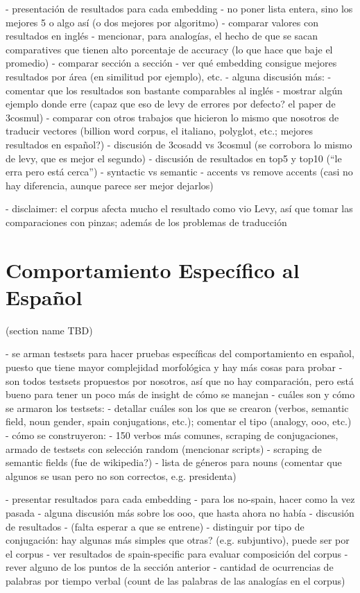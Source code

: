 - presentación de resultados para cada embedding
    - no poner lista entera, sino los mejores 5 o algo así (o dos mejores por algoritmo)
    - comparar valores con resultados en inglés
    - mencionar, para analogías, el hecho de que se sacan comparatives que tienen alto porcentaje de accuracy (lo que hace que baje el promedio)
        - comparar sección a sección
    - ver qué embedding consigue mejores resultados por área (en similitud por ejemplo), etc.
- alguna discusión más:
    - comentar que los resultados son bastante comparables al inglés
    - mostrar algún ejemplo donde erre (capaz que eso de levy de errores por defecto? el paper de 3cosmul)
    - comparar con otros trabajos que hicieron lo mismo que nosotros de traducir vectores (billion word corpus, el italiano, polyglot, etc.; mejores resultados en español?)
    - discusión de 3cosadd vs 3cosmul (se corrobora lo mismo de levy, que es mejor el segundo)
    - discusión de resultados en top5 y top10 (``le erra pero está cerca'')
    - syntactic vs semantic
    - accents vs remove accents (casi no hay diferencia, aunque parece ser mejor dejarlos)


- disclaimer: el corpus afecta mucho el resultado como vio Levy, así que tomar las comparaciones con pinzas; además de los problemas de traducción


\section{Comportamiento Específico al Español}
(section name TBD)

- se arman testsets para hacer pruebas específicas del comportamiento en español, puesto que tiene mayor complejidad morfológica y hay más cosas para probar
- son todos testsets propuestos por nosotros, así que no hay comparación, pero está bueno para tener un poco más de insight de cómo se manejan
- cuáles son y cómo se armaron los testsets:
    - detallar cuáles son los que se crearon (verbos, semantic field, noun gender, spain conjugations, etc.); comentar el tipo (analogy, ooo, etc.)
    - cómo se construyeron:
        - 150 verbos más comunes, scraping de conjugaciones, armado de testsets con selección random (mencionar scripts)
        - scraping de semantic fields (fue de wikipedia?)
        - lista de géneros para nouns (comentar que algunos se usan pero no son correctos, e.g. presidenta)

- presentar resultados para cada embedding
    - para los no-spain, hacer como la vez pasada
    - alguna discusión más sobre los ooo, que hasta ahora no había
- discusión de resultados
    - (falta esperar a que se entrene)
    - distinguir por tipo de conjugación: hay algunas más simples que otras? (e.g. subjuntivo), puede ser por el corpus
    - ver resultados de spain-specific para evaluar composición del corpus
    - rever alguno de los puntos de la sección anterior
    - cantidad de ocurrencias de palabras por tiempo verbal (count de las palabras de las analogías en el corpus)


